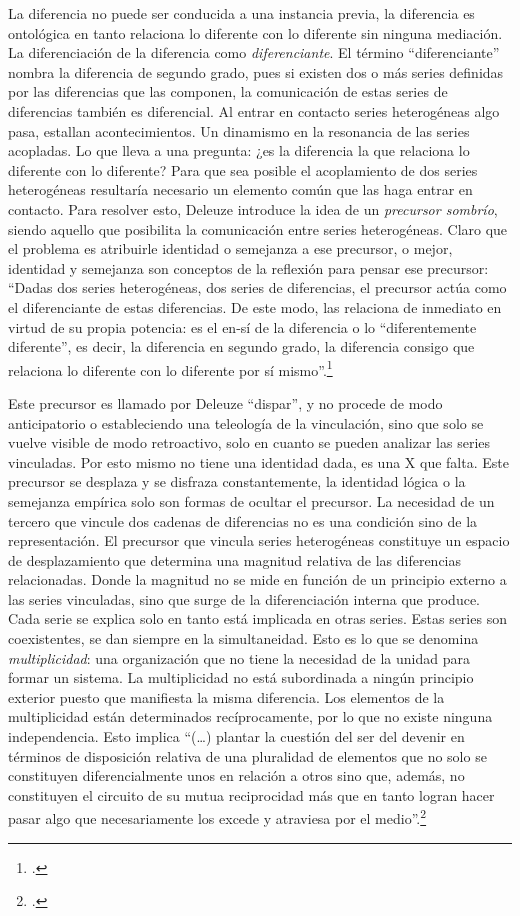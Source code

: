 \documentclass{book}
\begin{document}
La diferencia no puede ser conducida a una instancia previa, la
diferencia es ontológica en tanto relaciona lo diferente con lo
diferente sin ninguna mediación. La diferenciación de la diferencia como
\emph{diferenciante}. El término \enquote{diferenciante} nombra la diferencia de
segundo grado, pues si existen dos o más series definidas por las
diferencias que las componen, la comunicación de estas series de
diferencias también es diferencial. Al entrar en contacto series
heterogéneas algo pasa, estallan acontecimientos. Un dinamismo en la
resonancia de las series acopladas. Lo que lleva a una pregunta: ¿es la
diferencia la que relaciona lo diferente con lo diferente? Para que sea
posible el acoplamiento de dos series heterogéneas resultaría necesario
un elemento común que las haga entrar en contacto. Para resolver esto,
Deleuze introduce la idea de un \emph{precursor sombrío}, siendo aquello
que posibilita la comunicación entre series heterogéneas. Claro que el
problema es atribuirle identidad o semejanza a ese precursor, o mejor,
identidad y semejanza son conceptos de la reflexión para pensar ese
precursor: \enquote{Dadas dos series heterogéneas, dos series de diferencias, el
precursor actúa como el diferenciante de estas diferencias. De este
modo, las relaciona de inmediato en virtud de su propia potencia: es el
en-sí de la diferencia o lo ``diferentemente diferente'', es decir, la
diferencia en segundo grado, la diferencia consigo que relaciona lo
diferente con lo diferente por sí mismo}.\footcite[186]{deleuze2005b}

Este precursor es llamado por Deleuze \enquote{dispar}, y no procede de modo
anticipatorio o estableciendo una teleología de la vinculación, sino que
solo se vuelve visible de modo retroactivo, solo en cuanto se pueden
analizar las series vinculadas. Por esto mismo no tiene una identidad
dada, es una X que falta. Este precursor se desplaza y se disfraza
constantemente, la identidad lógica o la semejanza empírica solo son
formas de ocultar el precursor. La necesidad de un tercero que vincule
dos cadenas de diferencias no es una condición sino de la
representación. El precursor que vincula series heterogéneas constituye
un espacio de desplazamiento que determina una magnitud relativa de las
diferencias relacionadas. Donde la magnitud no se mide en función de un
principio externo a las series vinculadas, sino que surge de la
diferenciación interna que produce. Cada serie se explica solo en tanto
está implicada en otras series. Estas series son coexistentes, se dan
siempre en la simultaneidad. Esto es lo que se denomina
\emph{multiplicidad}: una organización que no tiene la necesidad de la
unidad para formar un sistema. La multiplicidad no está subordinada a
ningún principio exterior puesto que manifiesta la misma diferencia. Los
elementos de la multiplicidad están determinados recíprocamente, por lo
que no existe ninguna independencia. Esto implica \enquote{(\dots) plantar
la cuestión del ser del devenir en términos de disposición relativa de
una pluralidad de elementos que no solo se constituyen diferencialmente
unos en relación a otros sino que, además, no constituyen el circuito de
su mutua reciprocidad más que en tanto logran hacer pasar algo que
necesariamente los excede y atraviesa por el medio}.\footcite[15]{gallego2008}
\end{document}
